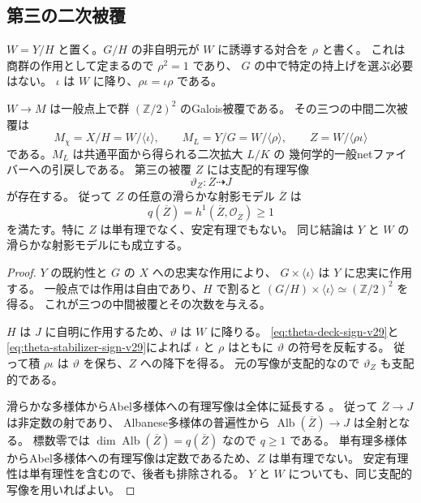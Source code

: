 \subsection{第三の二次被覆}

$W=Y/H$ と置く。$G/H$ の非自明元が $W$ に誘導する対合を $\rho$ と書く。
これは商群の作用として定まるので $\rho^2=1$ であり、
$G$ の中で特定の持上げを選ぶ必要はない。
$\iota$ は $W$ に降り、$\rho\iota=\iota\rho$ である。

\begin{theorem}[第三の二次被覆の非単有理性]
\label{thm:third-quadratic-cover-v29}
$W\to M$ は一般点上で群 $(\mathbb Z/2)^2$ のGalois被覆である。
その三つの中間二次被覆は
\[
 M_\chi=X/H=W/\langle\iota\rangle,\qquad
 M_L=Y/G=W/\langle\rho\rangle,\qquad
 Z=W/\langle\rho\iota\rangle
\]
である。$M_L$ は共通平面から得られる二次拡大 $L/K$ の
幾何学的一般netファイバーへの引戻しである。
第三の被覆 $Z$ には支配的有理写像
\[
 \vartheta_Z:Z\dashrightarrow J
\]
が存在する。
従って $Z$ の任意の滑らかな射影モデル $\overline Z$ は
\[
 q(\overline Z)=h^1(\overline Z,\mathcal O_{\overline Z})\ge1
\]
を満たす。特に $Z$ は単有理でなく、安定有理でもない。
同じ結論は $Y$ と $W$ の滑らかな射影モデルにも成立する。
\end{theorem}

\begin{proof}
$Y$ の既約性と $G$ の $X$ への忠実な作用により、
$G\times\langle\iota\rangle$ は $Y$ に忠実に作用する。
一般点では作用は自由であり、$H$ で割ると
$(G/H)\times\langle\iota\rangle\simeq(\mathbb Z/2)^2$ を得る。
これが三つの中間被覆とその次数を与える。

$H$ は $J$ に自明に作用するため、$\vartheta$ は $W$ に降りる。
\eqref{eq:theta-deck-sign-v29}と\eqref{eq:theta-stabilizer-sign-v29}によれば
$\iota$ と $\rho$ はともに $\vartheta$ の符号を反転する。
従って積 $\rho\iota$ は $\vartheta$ を保ち、$Z$ への降下を得る。
元の写像が支配的なので $\vartheta_Z$ も支配的である。

滑らかな多様体からAbel多様体への有理写像は全体に延長する
\cite[I, Theorem~3.2]{MilneAbelianVarieties2008}。
従って $\overline Z\to J$ は非定数の射であり、
Albanese多様体の普遍性から $\operatorname{Alb}(\overline Z)\to J$ は全射となる。
標数零では $\dim\operatorname{Alb}(\overline Z)=q(\overline Z)$ なので $q\ge1$ である。
単有理多様体からAbel多様体への有理写像は定数であるため、$Z$ は単有理でない。
安定有理性は単有理性を含むので、後者も排除される。
$Y$ と $W$ についても、同じ支配的写像を用いればよい。
\end{proof}

